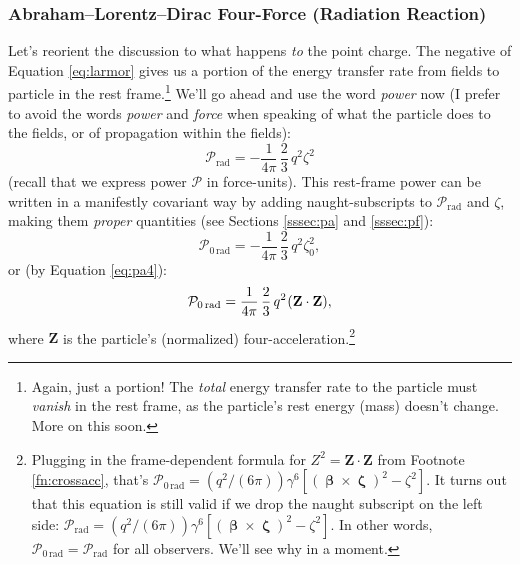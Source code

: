 \documentclass[12pt]{article}
\renewcommand{\vv}[1]{\mathbf{#1}}
\newcommand{\vvbeta}{\bm{\upbeta}}
\newcommand{\vvzeta}{\bm{\upzeta}}
\begin{document}
\subsubsection{Abraham--Lorentz--Dirac Four-Force (Radiation Reaction)}\label{sssec:aldforce}

Let's reorient the discussion to what happens \emph{to} the point charge. The negative of Equation \ref{eq:larmor} gives us a portion of the energy transfer rate from fields to particle in the rest frame.\footnote{Again, just a portion! The \emph{total} energy transfer rate to the particle must \emph{vanish} in the rest frame, as the particle's rest energy (mass) doesn't change. More on this soon.} We'll go ahead and use the word \emph{power} now (I prefer to avoid the words \emph{power} and \emph{force} when speaking of what the particle does to the fields, or of propagation within the fields):
\begin{equation*}
\mathcal{P}_{\textrm{rad}} = - \dfrac{1}{4 \pi} \, \dfrac{2}{3} \, q^2 \zeta^2
\end{equation*}
(recall that we express power $\mathcal{P}$ in force-units). This rest-frame power can be written in a manifestly covariant way by adding naught-subscripts to $\mathcal{P}_{\textrm{rad}}$ and $\zeta$, making them \emph{proper} quantities (see Sections \ref{sssec:pa} and \ref{sssec:pf}):
\begin{equation*}
\mathcal{P}_{0 \, \textrm{rad}} = - \dfrac{1}{4 \pi} \, \dfrac{2}{3} \, q^2 \zeta_0^2 ,
\end{equation*}
or (by Equation \ref{eq:pa4}):
\begin{equation}\label{eq:powerrad}
\mathcal{P}_{0 \, \textrm{rad}} = \dfrac{1}{4 \pi} \, \dfrac{2}{3} \, q^2 \mkern1mu (\vv Z \cdot \vv Z) ,
\end{equation}
where $\vv Z$ is the particle's (normalized) four-acceleration.\footnote{\label{fn:pradinv}Plugging in the frame-dependent formula for $Z^2 = \vv Z \cdot \vv Z$ from Footnote \ref{fn:crossacc}, that's $\mathcal{P}_{0 \, \textrm{rad}} = (q^2 / (6 \pi)) \gamma^6 [(\vvbeta \times \vvzeta)^2 - \zeta^2]$. It turns out that this equation is still valid if we drop the naught subscript on the left side: $\mathcal{P}_{\textrm{rad}} = (q^2 / (6 \pi)) \gamma^6 [(\vvbeta \times \vvzeta)^2 - \zeta^2]$. In other words, $\mathcal{P}_{0 \, \textrm{rad}} = \mathcal{P}_{\textrm{rad}}$ for all observers. We'll see why in a moment.}
\end{document}
